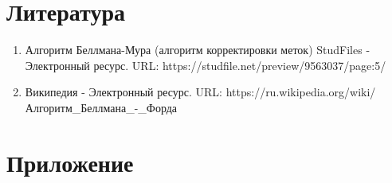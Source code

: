 \documentclass{report}
\begin{document}
\newpage

\section*{Литература}
\begin{enumerate}
\item Алгоритм Беллмана-Мура (алгоритм корректировки меток) StudFiles - Электронный ресурс. URL: https://studfile.net/preview/9563037/page:5/
\item Википедия - Электронный ресурс. URL: https://ru.wikipedia.org/wiki/Алгоритм\_Беллмана\_-\_Форда
\end{enumerate} 
\newpage

\section*{Приложение}
\end{document}
